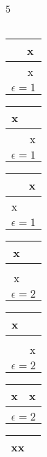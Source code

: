 \documentclass[a4paper  , 6 pt]{article}
\begin{document}
\begin{tiny}
\begin{multicols} {5}
\begin{tabular}{|c | c| }
\end{tabular}
\begin{tabular}{|c | c| }
 \cline{1-1}  \\ \hline
 & x \\ \hline 
 &  x \\
\hline
\multicolumn{2}{|c|}{$\epsilon = 1$} \\ \hline
\end{tabular}
\begin{tabular}{|c | c| }
 \cline{1-1}  \\ \hline
x &  \\ \hline 
 & x   \\
\hline
\multicolumn{2}{|c|}{$\epsilon = 1$} \\ \hline
\end{tabular} \newline
\begin{tabular}{|c | c| }
 \cline{1-1}  \\ \hline
 & x \\ \hline 
x &   \\
\hline
\multicolumn{2}{|c|}{$\epsilon = 1$} \\ \hline
\end{tabular}
\begin{tabular}{|c | c| }
 \cline{1-1} x \\ \hline
 &  \\ \hline 
x &   \\
\hline
\multicolumn{2}{|c|}{$\epsilon = 2$} \\ \hline
\end{tabular}
\begin{tabular}{|c | c| }
 \cline{1-1} x \\ \hline
 &  \\ \hline 
 & x  \\
\hline
\multicolumn{2}{|c|}{$\epsilon = 2$} \\ \hline
\end{tabular} \newline
\begin{tabular}{|c | c| }
 \cline{1-1}  \\ \hline
x & x \\ \hline 
 &   \\
\hline
\multicolumn{2}{|c|}{$\epsilon = 2$} \\ \hline
\end{tabular}
\begin{tabular}{|c | c| }
 \cline{1-1}  \\ \hline
xx &  \\ \hline 

\end{tabular}
\end{multicols}
\end{tiny}
\end{document}
